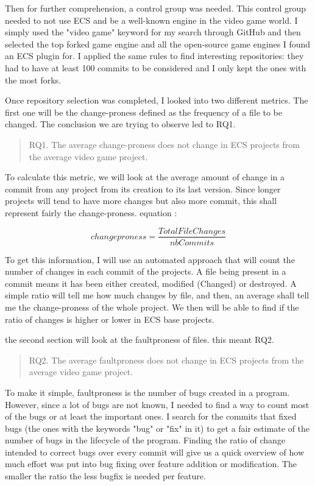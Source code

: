 \documentclass{IEEEcsmag}
\begin{document}
Then for further comprehension, a control group was needed. This control group needed to not use ECS and be a well-known engine in the video game world. I simply used the "video game" keyword for my search through GitHub and then selected the top forked game engine and all the open-source game engines I found an ECS plugin for. I applied the same rules to find interesting repositories: they had to have at least 100 commits to be considered and I only kept the ones with the most forks. 

Once repository selection was completed, I looked into two different metrics. The first one will be the change-proness defined as the frequency of a file to be changed. The conclusion we are trying to observe led to RQ1. 

\begin{quote}
    RQ1. The average change-proness does not change in ECS projects from the average video game project.
\end{quote}

To calculate this metric, we will look at the average amount of change in a commit from any project from its creation to its last version. Since longer projects will tend to have more changes but also more commit, this shall represent fairly the change-proness.
equation : 

\begin{equation}
    changeproness = \frac{TotalFileChanges}{nbCommits} 
\end{equation}

To get this information, I will use an automated approach that will count the number of changes in each commit of the projects. A file being present in a commit means it has been either created, modified (Changed) or destroyed. A simple ratio will tell me how much changes by file, and then, an average shall tell me the change-proness of the whole project. We then will be able to find if the ratio of changes is higher or lower in ECS base projects. 

the second section will look at the faultproness of files. this meant RQ2.

\begin{quote}
    RQ2. The average faultproness does not change in ECS projects from the average video game project.
\end{quote}

To make it simple, faultproness is the number of bugs created in a program. However, since a lot of bugs are not known, I needed to find a way to count most of the bugs or at least the important ones. I search for the commits that fixed bugs (the ones with the keywords "bug" or "fix" in it) to get a fair estimate of the number of bugs in the lifecycle of the program. Finding the ratio of change intended to correct bugs over every commit will give us a quick overview of how much effort was put into bug fixing over feature addition or modification. The smaller the ratio the less bugfix is needed per feature.
\end{document}
